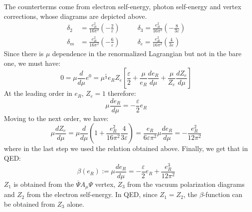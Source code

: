 \documentclass[../main.tex]{subfiles}
\begin{document}
\begin{example}
{The counterterms come from electron self-energy, photon self-energy and vertex corrections, whose diagrams are depicted above.}
\begin{align*}
\delta_2&=\frac{e_R^2}{16\pi^2}\left(-\frac{2}{\varepsilon}\right) \quad &&\delta_3=\frac{e_R^2}{16\pi^2}\left(-\frac{8}{3\varepsilon}\right)\\
\delta_m&=\frac{e_R^2}{16\pi^2}\left(-\frac{6}{\varepsilon}\right) \quad &&\delta_e=\frac{e_R^2}{16\pi^2}\left(\frac{4}{3\varepsilon}\right)
\end{align*}
Since there is $\mu$ dependence in the renormalized Lagrangian but not in the bare one, we must have:
\[
0=\mu\frac{d}{d\mu}e^0=\mu^{\frac{\varepsilon}{2}}e_RZ_e\left[\frac{\varepsilon}{2}+\frac{\mu}{e_R}\frac{de_R}{d\mu}+\frac{\mu}{Z_e}\frac{dZ_e}{d\mu}\right]
\]
At the leading order in $e_R$, $Z_e=1$ therefore:
\[
\mu\frac{de_R}{d\mu}=-\frac{\varepsilon}{2}e_R
\]
Moving to the next order, we have:
\[
\mu\frac{dZ_e}{d\mu}=\mu\frac{d}{d\mu}\left(1+\frac{e_R^2}{16\pi^2}\frac{4}{3\varepsilon}\right)=\frac{e_R}{6\varepsilon\pi^2}\mu\frac{de_R}{d\mu}=-\frac{e_R^2}{12\pi^2}
\]
where in the last step we used the relation obtained above. Finally, we get that in QED:
\[
\beta(e_R):=\mu\frac{de_R}{d\mu}=-\frac{\varepsilon}{2}e_R+\frac{e_R^3}{12\pi^2}
\]
$Z_1$ is obtained from the $\overline{\Psi}A_\mu\Psi$ vertex, $Z_3$ from the vacuum polarization diagrams and $Z_2$ from the electron self-energy. In QED, since $Z_1=Z_2$, the $\beta$-function can be obtained from $Z_3$ alone.

\end{example}
\end{document}
